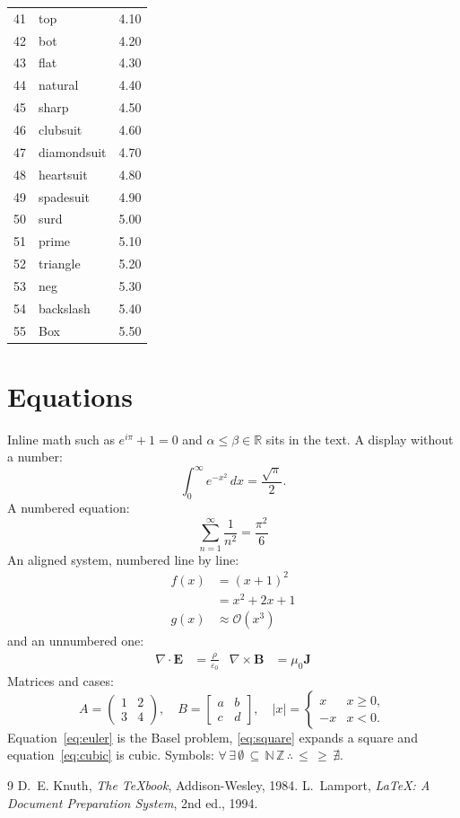 \documentclass[11pt]{article}
\begin{document}
\begin{longtable}{rlr}
  41 & top & 4.10 \\ 42 & bot & 4.20 \\ 43 & flat & 4.30 \\ 44 & natural & 4.40 \\ 45 & sharp & 4.50 \\
  46 & clubsuit & 4.60 \\ 47 & diamondsuit & 4.70 \\ 48 & heartsuit & 4.80 \\ 49 & spadesuit & 4.90 \\ 50 & surd & 5.00 \\
  51 & prime & 5.10 \\ 52 & triangle & 5.20 \\ 53 & neg & 5.30 \\ 54 & backslash & 5.40 \\ 55 & Box & 5.50 \\
\end{longtable}

\section{Equations}
Inline math such as $e^{i\pi} + 1 = 0$ and $\alpha \leq \beta \in \mathbb{R}$ sits in the text.
A display without a number:
\[
  \int_0^\infty e^{-x^2}\,dx = \frac{\sqrt{\pi}}{2}.
\]
A numbered equation:
\begin{equation}
  \label{eq:euler}
  \sum_{n=1}^{\infty} \frac{1}{n^2} = \frac{\pi^2}{6}
\end{equation}
An aligned system, numbered line by line:
\begin{align}
  f(x) &= (x+1)^2 \label{eq:square} \\
       &= x^2 + 2x + 1 \nonumber \\
  g(x) &\approx \mathcal{O}(x^3) \label{eq:cubic}
\end{align}
and an unnumbered one:
\begin{align*}
  \nabla \cdot \mathbf{E} &= \frac{\rho}{\varepsilon_0} &
  \nabla \times \mathbf{B} &= \mu_0 \mathbf{J}
\end{align*}
Matrices and cases:
\[
  A = \begin{pmatrix} 1 & 2 \\ 3 & 4 \end{pmatrix}, \quad
  B = \begin{bmatrix} a & b \\ c & d \end{bmatrix}, \quad
  |x| = \begin{cases} x & x \geq 0, \\ -x & x < 0. \end{cases}
\]
Equation~\eqref{eq:euler} is the Basel problem, \eqref{eq:square} expands a square and
equation~\ref{eq:cubic} is cubic. Symbols: $\forall\, \exists\, \emptyset\, \subseteq\, \mathbb{N}\, \mathbb{Z}\, \therefore\, \leqslant\, \geqslant\, \nexists$.

\begin{thebibliography}{9}
 D.~E. Knuth, \emph{The \TeX book}, Addison-Wesley, 1984.
 L.~Lamport, \emph{\LaTeX: A Document Preparation System}, 2nd ed., 1994.
\end{thebibliography}
\end{document}
